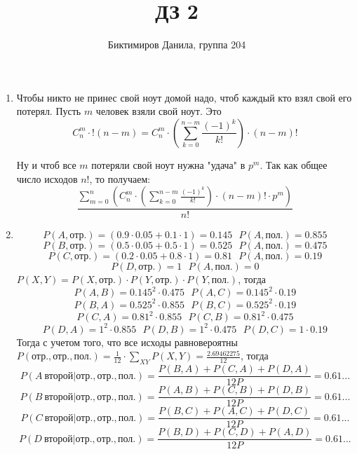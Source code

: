 \documentclass[11pt]{article}
\begin{document}
	
	\author{Биктимиров Данила, группа 204}
	\title{ДЗ 2}
	\date{}
	\maketitle
	
	\medskip
	
	\begin{enumerate}
		
		\item Чтобы никто не принес свой ноут домой надо, чтоб каждый кто взял свой его потерял. Пусть $m$ человек взяли свой ноут. Это 
		$$C^m_n \cdot !(n-m) = C^m_n \cdot \left(\sum_{k=0}^{n-m}\frac{(-1)^k}{k!}\right) \cdot (n-m)!$$
		
		Ну и чтоб все $m$ потеряли свой ноут нужна "удача" в $p^m$. Так как общее число исходов $n!$, то получаем:
		$$\frac{\sum_{m=0}^{n}\left(C^m_n\cdot \left( \sum_{k=0}^{n-m} \frac{(-1)^k}{k!} \right) \cdot (n-m)!\cdot p^m \right)}{n!}$$
		
		\item
		$$P(A, \text{отр.})=(0.9 \cdot 0.05 + 0.1 \cdot 1)=0.145\:\:\: P(A, \text{пол.})=0.855$$
		$$P(B, \text{отр.})=(0.5 \cdot 0.05 + 0.5 \cdot 1)=0.525\:\:\: P(A, \text{пол.})=0.475$$
		$$P(C, \text{отр.})=(0.2 \cdot 0.05 + 0.8 \cdot 1)=0.81\:\:\: P(A, \text{пол.})=0.19$$
		$$P(D, \text{отр.})=1\:\:\: P(A, \text{пол.})=0$$
		$P(X,Y)=P(X,\text{отр.})\cdot P(Y,\text{отр.})\cdot P(Y,\text{пол.})$, тогда
		$$P(A,B)=0.145^2\cdot 0.475\:\:\: P(A,C)=0.145^2\cdot 0.19$$
		$$P(B,A)=0.525^2\cdot 0.855\:\:\: P(B,C)=0.525^2\cdot 0.19$$
		$$P(C,A)=0.81^2\cdot 0.855\:\:\: P(C,B)=0.81^2\cdot 0.475$$
		$$P(D,A)=1^2\cdot 0.855\:\:\: P(D,B)=1^2\cdot 0.475\:\:\: P(D,C)=1\cdot 0.19$$
		Тогда с учетом того, что все исходы равновероятны $P(\text{отр.},\text{отр.},\text{пол.})=\frac{1}{12}\cdot \sum_{XY} P(X,Y)=\frac{2.69462275}{12}$, тогда
		$$P(A\:\text{второй}|\text{отр.},\text{отр.},\text{пол.})=\frac{P(B,A) + P(C,A)+P(D,A)}{12P}=0.61...$$
		$$P(B\:\text{второй}|\text{отр.},\text{отр.},\text{пол.})=\frac{P(A,B) + P(C,B)+P(D,B)}{12P}=0.61...$$
		$$P(C\:\text{второй}|\text{отр.},\text{отр.},\text{пол.})=\frac{P(B,C) + P(A,C)+P(D,C)}{12P}=0.61...$$
		$$P(D\:\text{второй}|\text{отр.},\text{отр.},\text{пол.})=\frac{P(B,D) + P(C,D)+P(A,D)}{12P}=0.61...$$
		
	\end{enumerate}
\end{document}
